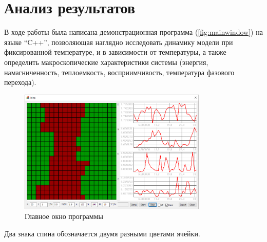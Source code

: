 \documentclass[12pt,a4paper]{article}
\begin{document}
    \section{Анализ результатов}

        В ходе работы была написана демонстрационная программа (\autoref{fig:mainwindow}) на языке  \enquote{C++}, позволяющая наглядно исследовать динамику модели при фиксированной температуре, и в зависимости от температуры, а также определить макроскопические характеристики системы (энергия, намагниченность, теплоемкость, восприимчивость, температура фазового перехода).
        \begin{figure}[h]
            \centering
            \includegraphics[width=0.8\textwidth]{mainwindow}
            \caption[]{Главное окно программы}
            \label{fig:mainwindow}
        \end{figure}
        Два знака спина обозначается двумя разными цветами ячейки.
\end{document}
